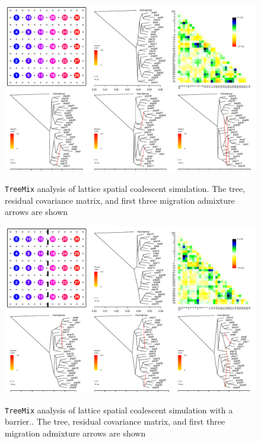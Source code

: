 \documentclass[10pt,letterpaper]{article}
\begin{document}
\clearpage

\begin{figure}
	\centering
		{\includegraphics[width=\textwidth]{../figs/sims/Treemix_comparison/ms_dataset_stationary_popstreemix_fig_sequential.pdf}}
	\caption{\texttt{TreeMix} analysis of lattice spatial coalescent simulation.  The tree, residual covariance matrix, and first three migration admixture arrows are shown}\label{sfig:treemix_lattice}
\end{figure}

\begin{figure}
	\centering
		{\includegraphics[width=\textwidth]{../figs/sims/Treemix_comparison/ms_dataset_barriertreemix_fig_sequential.pdf}}
	\caption{\texttt{TreeMix} analysis of lattice spatial coalescent simulation with a barrier..  The tree, residual covariance matrix, and first three migration admixture arrows are shown}\label{sfig:treemix_barrier}
\end{figure}
\end{document}
